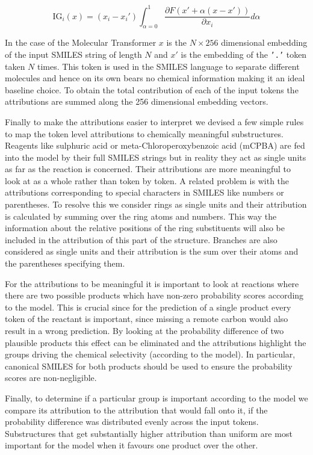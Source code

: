 \begin{equation}
\label{eqn:IG}
    \textrm{IG}_i(x) = (x_i - x_i') \int_{\alpha=0}^1 \frac{\partial F(x' + \alpha(x-x'))}{\partial x_i} d\alpha
\end{equation}

In the case of the Molecular Transformer $x$ is the $ N\times 256$ dimensional embedding of the input SMILES string of length $N$ and $x'$ is the embedding of the \texttt{'.'} token taken $N$ times. This token is used in the SMILES language to separate different molecules and hence on its own bears no chemical information making it an ideal baseline choice. To obtain the total contribution of each of the input tokens the attributions are summed along the 256 dimensional embedding vectors.

Finally to make the attributions easier to interpret we devised a few simple rules to map the token level attributions to chemically meaningful substructures. Reagents like sulphuric acid or meta-Chloroperoxybenzoic acid (mCPBA) are fed into the model by their full SMILES strings but in reality they act as single units as far as the reaction is concerned. Their attributions are more meaningful to look at as a whole rather than token by token. A related problem is with the attributions corresponding to special characters in SMILES like numbers or parentheses. To resolve this we consider rings as single units and their attribution is calculated by summing over the ring atoms and numbers. This way the information about the relative positions of the ring substituents will also be included in the attribution of this part of the structure. Branches are also considered as single units and their attribution is the sum over their atoms and the parentheses specifying them.

For the attributions to be meaningful it is important to look at reactions where there are two possible products which have non-zero probability scores according to the model. This is crucial since for the prediction of a single product every token of the reactant is important, since missing a remote carbon would also result in a wrong prediction. By looking at the probability difference of two plausible products this effect can be eliminated and the attributions highlight the groups driving the chemical selectivity (according to the model). In particular, canonical SMILES for both products should be used to ensure the probability scores are non-negligible.

Finally, to determine if a particular group is important according to the model we compare its attribution to the attribution that would fall onto it, if the probability difference was distributed evenly across the input tokens. Substructures that get substantially higher attribution than uniform are most important for the model when it favours one product over the other.

